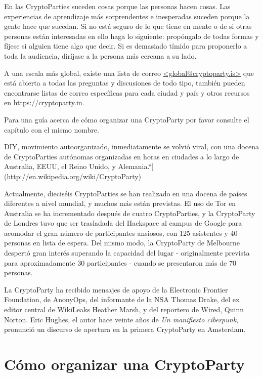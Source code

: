 \documentclass[10pt,a5paper,twoside,,]{book}
\begin{document}
En las CryptoParties suceden cosas porque las personas hacen cosas. Las
experiencias de aprendizaje más sorprendentes e inesperadas suceden
porque la gente hace que sucedan. Si no está seguro de lo que tiene en
mente o de si otras personas están interesadas en ello haga lo
siguiente: propóngalo de todas formas y fíjese si alguien tiene algo que
decir. Si es demasiado tímido para proponerlo a toda la audiencia,
diríjase a la persona más cercana a su lado.

A una escala más global, existe una lista de correo
\href{https://cryptoparty.is/mailman/listinfo/global}{\textless{}global@cryptoparty.is\textgreater{}}
que está abierta a todas las preguntas y discusiones de todo tipo,
también pueden encontrarse listas de correo específicas para cada ciudad
y país y otros recursos en https://cryptoparty.in.

Para una guía acerca de cómo organizar una CryptoParty por favor
consulte el capítulo con el mismo nombre.

DIY, movimiento autoorganizado, inmediatamente se volvió viral, con una
docena de CryptoParties autónomas organizadas en horas en ciudades a lo
largo de Australia, EEUU, el Reino Unido, y
Alemania.``{]}(http://en.wikipedia.org/wiki/CryptoParty)

Actualmente, dieciséis CryptoParties se han realizado en una docena de
países diferentes a nivel mundial, y muchos más están previstas. El uso
de Tor en Australia se ha incrementado después de cuatro CryptoParties,
y la CryptoParty de Londres tuvo que ser trasladada del Hackspace al
campus de Google para acomodar el gran número de participantes ansiosos,
con 125 asistentes y 40 personas en lista de espera. Del mismo modo, la
CryptoParty de Melbourne despertó gran interés superando la capacidad
del lugar - originalmente prevista para aproximadamente 30 participantes
- cuando se presentaron más de 70 personas.

La CryptoParty ha recibido mensajes de apoyo de la Electronic Frontier
Foundation, de AnonyOps, del informante de la NSA Thomas Drake, del ex
editor central de WikiLeaks Heather Marsh, y del reportero de Wired,
Quinn Norton. Eric Hughes, el autor hace veinte años de \emph{Un
manifiesto ciberpunk}, pronunció un discurso de apertura en la primera
CryptoParty en Amsterdam.

\chapter{Cómo organizar una
CryptoParty}\label{cuxf3mo-organizar-una-cryptoparty}
\end{document}
